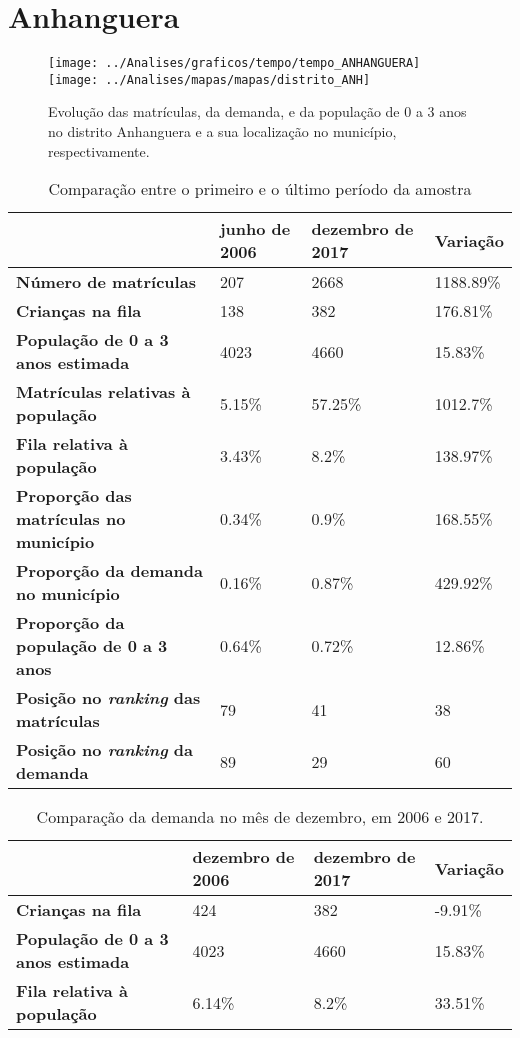 \section{Anhanguera}
\begin{figure}[H]
	\centering
	\texttt{[image: ../Analises/graficos/tempo/tempo\_ANHANGUERA]}
	\texttt{[image: ../Analises/mapas/mapas/distrito\_ANH]}
	\caption{Evolução das matrículas, da demanda, e da população de 0 a 3 anos no distrito Anhanguera e a sua localização no município, respectivamente.}
\end{figure}
\begin{table}[H]
	\begin{tabular}{|l|l|l|l|}
		\hline
		\textbf{}                                      & \textbf{junho de 2006}       & \textbf{dezembro de 2017}    & \textbf{Variação} \\ \hline
		\textbf{Número de matrículas}                  & 207 & 2668 & 1188.89\% \\ \hline
		\textbf{Crianças na fila}                      & 138 & 382 & 176.81\% \\ \hline
		\textbf{População de 0 a 3 anos estimada}      & 4023 & 4660 & 15.83\% \\ \hline
		\textbf{Matrículas relativas à população}      & 5.15\% & 57.25\% & 1012.7\% \\ \hline
		\textbf{Fila relativa à população}             & 3.43\% & 8.2\% & 138.97\% \\ \hline
		\textbf{Proporção das matrículas no município} & 0.34\% & 0.9\% & 168.55\% \\ \hline
		\textbf{Proporção da demanda no município}     & 0.16\% & 0.87\% & 429.92\% \\ \hline
		\textbf{Proporção da população de 0 a 3 anos}  & 0.64\% & 0.72\% & 12.86\% \\ \hline
		\textbf{Posição no \textit{ranking} das matrículas}     & 79 & 41 & 38 \\ \hline
		\textbf{Posição no \textit{ranking} da demanda}         & 89 & 29 & 60 \\ \hline
	\end{tabular}
	\caption{Comparação entre o primeiro e o último período da amostra}
\end{table}
\begin{table}[H]
	\begin{tabular}{|l|l|l|l|}
		\hline
		\textbf{}                                 & \textbf{dezembro de 2006} & \textbf{dezembro de 2017} & \textbf{Variação} \\ \hline
		\textbf{Crianças na fila}                      & 424 & 382 & -9.91\% \\ \hline
		\textbf{População de 0 a 3 anos estimada}      & 4023 & 4660 & 15.83\% \\ \hline
		\textbf{Fila relativa à população}             & 6.14\% & 8.2\% & 33.51\% \\ \hline
	\end{tabular}
	\caption{Comparação da demanda no mês de dezembro, em 2006 e 2017.}
\end{table}
